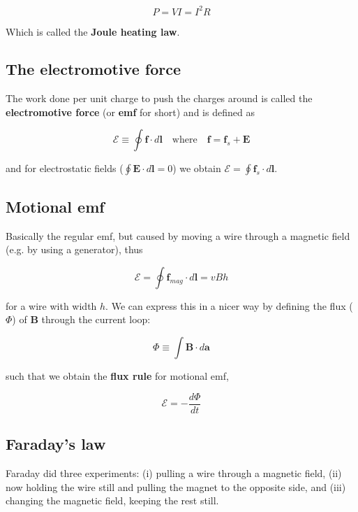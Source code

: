 \documentclass[a4paper]{article}
\begin{document}
\begin{equation}
    P=VI=I^2R
\end{equation}

Which is called the \textbf{Joule heating law}.

\subsection{The electromotive force}
The work done per unit charge to push the charges around is called the \textbf{electromotive force} (or \textbf{emf} for short) and is defined as

\begin{equation}
    \mathcal{E}\equiv \oint\bm{f}\cdot d\bm{l}\quad\text{where}\quad \bm{f}=\bm{f}_s+\bm{E}
\end{equation}

and for electrostatic fields ($\oint \bm{E}\cdot d\bm{l}=0$) we obtain $\mathcal{E}=\oint\bm{f}_s\cdot d\bm{l}$.

\subsection{Motional emf}
Basically the regular emf, but caused by moving a wire through a magnetic field (e.g. by using a generator), thus

\begin{equation}
    \mathcal{E}=\oint \bm{f}_{mag}\cdot d\bm{l}=vBh
\end{equation}

for a wire with width $h$. We can express this in a nicer way by defining the flux ($\Phi$) of $\bm{B}$ through the current loop:

\begin{equation}
    \Phi\equiv\int\bm{B}\cdot d\bm{a}
\end{equation}

such that we obtain the \textbf{flux rule} for motional emf,

\begin{equation}
    \mathcal{E}=-\frac{d\Phi}{dt}
\end{equation}

\subsection{Faraday's law}

Faraday did three experiments: (i) pulling a wire through a magnetic field, (ii) now holding the wire still and pulling the magnet to the opposite side, and (iii) changing the magnetic field, keeping the rest still.
\end{document}
